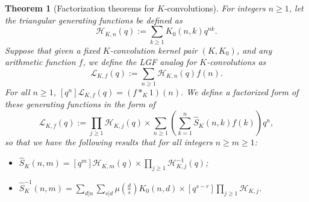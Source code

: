 \documentclass[12pt,reqno,a4letter]{article}
\numberwithin{figure}{section}
\numberwithin{table}{section}
\numberwithin{equation}{section}
\theoremstyle{plain}
\newtheorem{theorem}{Theorem}
\numberwithin{theorem}{section}
\theoremstyle{definition}
\begin{document}
\begin{theorem}[Factorization theorems for $K$-convolutions]
\label{theorem_InvertibleFactThmStmtsForKCvls_v1} 
For integers $n \geq 1$, let the triangular generating functions be defined as 
\[
\mathcal{H}_{K,n}(q) := \sum_{k \geq 1} K_0(n, k) q^{nk}. 
\]
Suppose that given a fixed $K$-convolution kernel pair 
$(K, K_0)$, and any arithmetic function $f$, 
we define the LGF analog for $K$-convolutions as 
\[
\mathcal{L}_{K,f}(q) := \sum_{n \geq 1} \mathcal{H}_{K,n}(q) f(n). 
\]
For all $n \geq 1$, $[q^n] \mathcal{L}_{K,f}(q) = (f \ast_K 1)(n)$. 
We define a factorized form of these generating functions in the form of 
\[
\mathcal{L}_{K,f}(q) := \prod_{j \geq 1} \mathcal{H}_{K,j}(q) \times 
     \sum_{n \geq 1} \left(\sum_{k=1}^n \hat{S}_K(n, k) f(k)\right) q^n, 
\]
so that we have the following results that for all integers $n \geq m \geq 1$: 
\begin{itemize} 
\item[(i)] $\hat{S}_K(n, m) = [q^m] \mathcal{H}_{K,m}(q) \times \prod_{j \geq 1} \mathcal{H}_{K,j}^{-1}(q)$; 
\item[(ii)] $\hat{S}_K^{-1}(n, m) = \sum\limits_{d|n} \sum\limits_{s|d} \mu\left(\frac{d}{s}\right) K_0(n, d) 
             \times [q^{s-r}] \prod\limits_{j \geq 1} \mathcal{H}_{K,j}$. 
\end{itemize}
\end{theorem}
\end{document}
